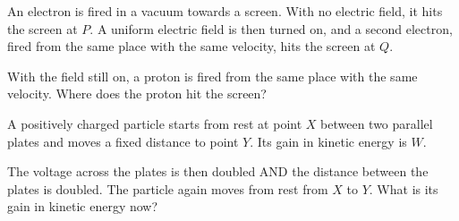 \begin{quizq}{}
An electron is fired in a vacuum towards a screen. With no electric field, it hits the screen at $P$.
A uniform electric field is then turned on, and a second electron, fired from the same place with the
same velocity, hits the screen at $Q$.
\begin{center}
\end{center}
With the field still on, a proton is fired from the same place with the same velocity. Where does the
proton hit the screen?
\end{quizq}

\begin{quizq}{}
A positively charged particle starts from rest at point $X$ between two parallel plates and moves a
fixed distance to point $Y$. Its gain in kinetic energy is $W$.

The voltage across the plates is then doubled AND the distance between the plates is doubled. The
particle again moves from rest from $X$ to $Y$. What is its gain in kinetic energy now?
\end{quizq}

